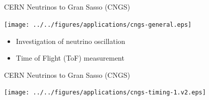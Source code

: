 \documentclass[compress,red]{beamer}
\begin{document}
\subsection{}
\begin{frame}{CERN Neutrinos to Gran Sasso (CNGS)}

    \begin{center}
      \texttt{[image: ../../figures/applications/cngs-general.eps]}
    \end{center}

    \begin{center}
      \begin{itemize}
	\item Investigation of neutrino oscillation
	\item Time of Flight (ToF) measurement
      \end{itemize}

    \end{center}


\end{frame}
\begin{frame}{CERN Neutrinos to Gran Sasso (CNGS)}

      \begin{center}
      
      \texttt{[image: ../../figures/applications/cngs-timing-1.v2.eps]} 
      \end{center}

\end{frame}
\end{document}

